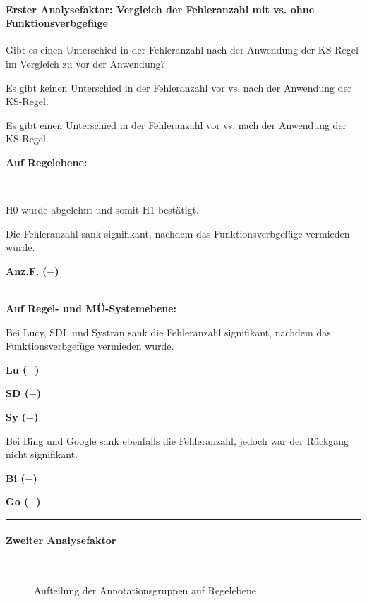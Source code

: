 
\paragraph*{Erster Analysefaktor: Vergleich der Fehleranzahl mit vs. ohne Funktionsverbgefüge}
\begin{description}[font=\normalfont\bfseries]
\item [Fragestellung:] Gibt es einen Unterschied in der Fehleranzahl nach der Anwendung der KS-Regel im Vergleich zu vor der Anwendung?
\item [H0 --] Es gibt keinen Unterschied in der Fehleranzahl vor vs. nach der Anwendung der KS-Regel.
\item [H1 --] Es gibt einen Unterschied in der Fehleranzahl vor vs. nach der Anwendung der KS-Regel.
\item [Resultat]
\end{description}
\noindent
\parbox[t]{.8\textwidth}{\textbf{Auf Regelebene:}}\\
\noindent
\parbox[t]{.8\textwidth}{
H0 wurde abgelehnt und somit H1 bestätigt.

Die Fehleranzahl sank signifikant, nachdem das Funktionsverbgefüge vermieden wurde.}
\parbox[t]{.04\textwidth}{}
\colorbox{smGreen}{\parbox[t]{.15\textwidth}{\textbf{Anz.F.} \textbf{($-$)}\\
\\
}}

\noindent
\parbox[t]{.8\textwidth}{\textbf{Auf Regel- und MÜ-Systemebene:}

Bei Lucy, SDL und Systran sank die Fehleranzahl signifikant, nachdem das Funktionsverbgefüge vermieden wurde.}
\parbox[t]{.04\textwidth}{}
\colorbox{smGreen}{\parbox[t]{.15\textwidth}{\textbf{Lu ($-$)}

\textbf{SD ($-$)}

 \textbf{Sy ($-$)}}}

\medskip
 \noindent
 \parbox[t]{.8\textwidth}{Bei Bing und Google sank ebenfalls die Fehleranzahl, jedoch war der Rückgang nicht signifikant.}
 \parbox[t]{.04\textwidth}{}
 \parbox[t]{.15\textwidth}{\textbf{Bi ($-$)}

 \textbf{Go ($-$)}\vspace{11pt}}
\hrule
\paragraph*{Zweiter Analysefaktor}\hfill\\
\begin{figure}[H]

\caption{Aufteilung der Annotationsgruppen auf Regelebene }
\end{figure}

